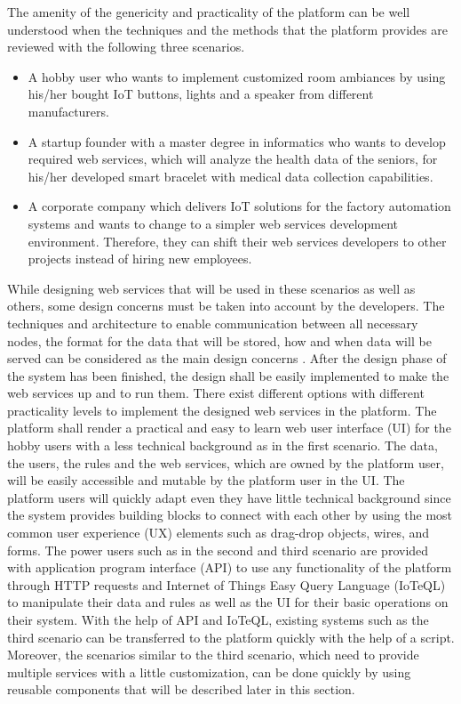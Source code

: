The amenity of the genericity and practicality of the platform can be well understood when the techniques and the methods that the platform provides are reviewed with the following three scenarios.
\begin{itemize}

 \item A hobby user who wants to implement customized room ambiances by using his/her bought IoT buttons, lights and a speaker from different manufacturers.
 \item A startup founder with a master degree in informatics who wants to develop required web services, which will analyze the health data of the seniors, for his/her developed smart bracelet with medical data collection capabilities.
 \item A corporate company which delivers IoT solutions for the factory automation systems and wants to change to a simpler web services development environment. Therefore, they can shift their web services developers to other projects instead of hiring new employees.

\end{itemize}
While designing web services that will be used in these scenarios as well as others, some design concerns must be taken into account by the developers. The techniques and architecture to enable communication between all necessary nodes, the format for the data that will be stored, how and when data will be served can be considered as the main design concerns \cite{6651222}. After the design phase of the system has been finished, the design shall be easily implemented to make the web services up and to run them. 
There exist different options with different practicality levels to implement the designed web services in the platform. The platform shall render a practical and easy to learn web user interface (UI) for the hobby users with a less technical background as in the first scenario. The data, the users, the rules and the web services, which are owned by the platform user, will be easily accessible and mutable by the platform user in the UI. The platform users will quickly adapt even they have little technical background since the system provides building blocks to connect with each other by using the most common user experience (UX) elements such as drag-drop objects, wires, and forms. The power users such as in the second and third scenario are provided with application program interface (API) to use any functionality of the platform through HTTP requests and Internet of Things Easy Query Language (IoTeQL) to manipulate their data and rules as well as the UI for their basic operations on their system. With the help of API and IoTeQL, existing systems such as the third scenario can be transferred to the platform quickly with the help of a script. Moreover, the scenarios similar to the third scenario, which need to provide multiple services with a little customization, can be done quickly by using reusable components that will be described later in this section.

